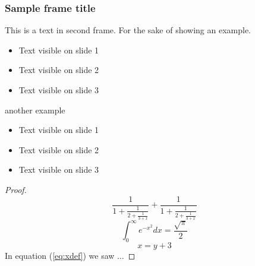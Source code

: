 \documentclass{beamer}
\begin{document}
\begin{frame}
\frametitle{Sample frame title}
This is a text in second frame.
For the sake of showing an example.

\begin{itemize}
 \item Text visible on slide 1
 \item Text visible on slide 2
 \item Text visible on slide 3
\end{itemize}

\vspace{0.3cm}

another example

\begin{itemize}\itemsep0em
 \item Text visible on slide 1
 \item Text visible on slide 2
 \item Text visible on slide 3
\end{itemize}
\end{frame}

\begin{frame}
  \begin{proof}
    $$
 \frac{1}{\displaystyle 1+
   \frac{1}{\displaystyle 2+
   \frac{1}{\displaystyle 3+x}}} +
 \frac{1}{1+\frac{1}{2+\frac{1}{3+x}}}
$$
$$\int_0^\infty e^{-x^2} dx=\frac{\sqrt{\pi}}{2}$$
\begin{equation} x=y+3 \label{eq:xdef}
\end{equation}
In equation (\ref{eq:xdef}) we saw $\dots$
  \end{proof}
\end{frame}
\end{document}
